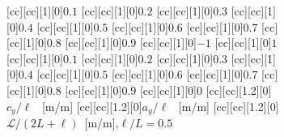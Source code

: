 \begin{figure}[h!]
\begin{subfigure}[h]{0.8\textwidth}
[cc][cc][1][0]{$0.1$}
[cc][cc][1][0]{$0.2$}
[cc][cc][1][0]{$0.3$}
[cc][cc][1][0]{$0.4$}
[cc][cc][1][0]{$0.5$}
[cc][cc][1][0]{$0.6$}
[cc][cc][1][0]{$0.7$}
[cc][cc][1][0]{$0.8$}
[cc][cc][1][0]{$0.9$}
[cc][cc][1][0]{$-1$}
[cc][cc][1][0]{$1$}
[cc][cc][1][0]{$0.1$}
[cc][cc][1][0]{$0.2$}
[cc][cc][1][0]{$0.3$}
[cc][cc][1][0]{$0.4$}
[cc][cc][1][0]{$0.5$}
[cc][cc][1][0]{$0.6$}
[cc][cc][1][0]{$0.7$}
[cc][cc][1][0]{$0.8$}
[cc][cc][1][0]{$0.9$}
[cc][cc][1][0]{$0$}
[cc][cc][1.2][0]{$c_y/\ell$ \ [m/m]}
[cc][cc][1.2][0]{$a_y/\ell$ \ [m/m]}
[cc][cc][1.2][0]{$\mathcal{L}/(2L+\ell)$\ [m/m],\quad $\ell/L =0.5$}
\caption{}
\end{subfigure}
\end{figure}
